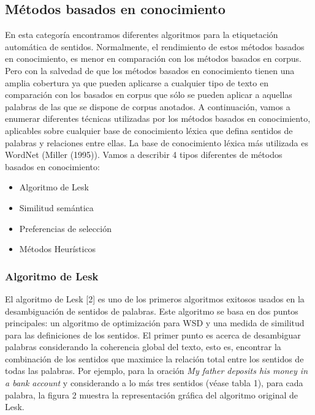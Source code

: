 \subsection{Métodos basados en conocimiento}
En esta categoría encontramos diferentes algoritmos para la etiquetación automática de sentidos. Normalmente, el rendimiento de estos métodos basados en conocimiento, es menor en comparación con los métodos basados en corpus. Pero con la salvedad de que los métodos basados en conocimiento tienen una amplia cobertura ya que pueden aplicarse a cualquier tipo de texto en comparación con los basados en corpus que sólo se pueden aplicar a aquellas palabras de las que se dispone de corpus anotados. A continuación, vamos a enumerar diferentes técnicas utilizadas por los métodos basados en conocimiento, aplicables sobre cualquier base de conocimiento léxica que defina sentidos de palabras y relaciones entre ellas. La base de conocimiento léxica más utilizada es WordNet (Miller (1995)). Vamos a describir 4 tipos diferentes de métodos basados en conocimiento:

\begin{itemize}
  \item Algoritmo de Lesk
  \item Similitud semántica
  \item Preferencias de selección
  \item Métodos Heurísticos
\end{itemize}

\subsubsection{Algoritmo de Lesk}
El algoritmo de Lesk [2] es uno de los primeros algoritmos exitosos usados en la desambiguación de sentidos de palabras. Este algoritmo se basa en dos puntos principales: un algoritmo de optimización para WSD y una medida de similitud para las definiciones de los sentidos.
El primer punto es acerca de desambiguar palabras considerando la coherencia global del texto, esto es, encontrar la combinación de los sentidos que maximice la relación total entre los sentidos de todas las palabras. 
Por ejemplo, para la oración \textit{My father deposits his money in a bank account} y considerando a lo más tres sentidos (véase tabla 1), para cada palabra, la figura 2 muestra la representación gráfica del algoritmo original de Lesk.

